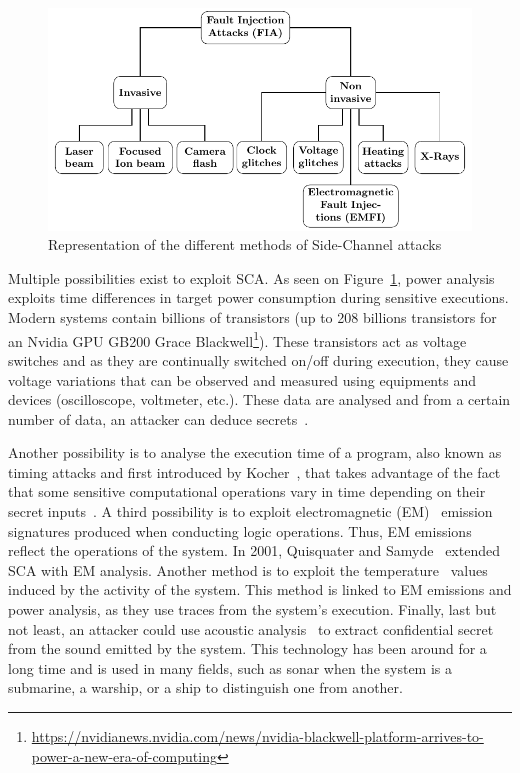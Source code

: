 \begin{figure}[ht]
    \centering
    \includegraphics[page=3, width=.75\textwidth]{c2_soa/img/physicalAttacks.pdf}
    \caption{Representation of the different methods of Side-Channel attacks}
    \label{fig:sca}
\end{figure}

Multiple possibilities exist to exploit SCA.
As seen on Figure~\ref{fig:sca}, power analysis exploits time differences in target power consumption during sensitive executions. Modern systems contain billions of transistors (up to 208 billions transistors for an Nvidia GPU GB200 Grace Blackwell\footnote{\hfill\url{https://nvidianews.nvidia.com/news/nvidia-blackwell-platform-arrives-to-power-a-new-era-of-computing}}).
These transistors act as voltage switches and as they are continually switched on/off during execution, they cause voltage variations that can be observed and measured using equipments and devices (oscilloscope, voltmeter, etc.). These data are analysed and from a certain number of data, an attacker can deduce secrets~\cite{KJJ-98-crypto,KJJR-11-jce,GP-99-ches,LKOSECG-21-sp}.

Another possibility is to analyse the execution time of a program, also known as timing attacks and first introduced by Kocher~\cite{K-96-crypto}, that takes advantage of the fact that some sensitive computational operations vary in time depending on their secret inputs~\cite{DD-05-compnet}.
A third possibility is to exploit electromagnetic (EM)~\cite{ANM-19-di,HMHSS-12-tcrypo,KSTO-17-iccad, WDL-16-ntms,HGTVJ-22-dt} emission signatures produced when conducting logic operations. Thus, EM emissions reflect the operations of the system. In 2001, Quisquater and Samyde~\cite{QS-01-scps} extended SCA with EM analysis.
Another method is to exploit the temperature~\cite{HS-14-cardis,AZRHT-21-tvlsi} values induced by the activity of the system. This method is linked to EM emissions and power analysis, as they use traces from the system's execution.
Finally, last but not least, an attacker could use acoustic analysis~\cite{BDGPS-10-usenix,GST-17-crypto,HTM-23-eurospw} to extract confidential secret from the sound emitted by the system. This technology has been around for a long time and is used in many fields, such as sonar when the system is a submarine, a warship, or a ship to distinguish one from another.

